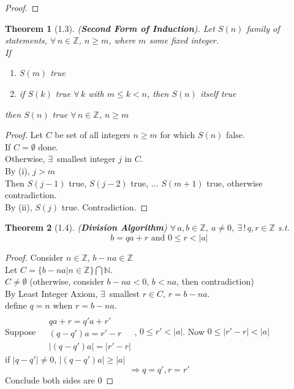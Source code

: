 \documentclass[twoside,landscape]{amsart}
\theoremstyle{plain}
\newtheorem{theorem}{Theorem}
\theoremstyle{definition}
\theoremstyle{remark}
\begin{document}
\begin{multicols*}{2}
\begin{proof}
\end{proof}


\begin{theorem}[1.3] (\textbf{Second Form of Induction}).  Let $S(n)$ family of statements, $\forall \, n \in \mathbb{Z}$, $n\geq m$, where $m$ some fixed integer.  \\
If \begin{enumerate}
\item[(i)] $S(m)$ true 
\item[(ii)] if $S(k)$ true $\forall \, k $ with $m \leq k <n$, then $S(n)$ itself true
\end{enumerate}
then $S(n)$ true $\forall \, n \in \mathbb{Z}$, $n\geq m$
\end{theorem}
\begin{proof} Let $C$ be set of all integers $n\geq m$ for which $S(n)$ false. \\
If $C =\emptyset$ done. \\
Otherwise, $\exists \, $ smallest integer $j$ in $C$. \\

By (i), $j > m$ \\
Then $S(j-1)$ true, $S(j-2)$ true, $\dots$ $S(m+1)$ true, otherwise contradiction. \\
By (ii), $S(j)$ true.  Contradiction.

\end{proof}

\begin{theorem}[1.4] (\textbf{Division Algorithm})
  $\forall \, a , b \in \mathbb{Z}$, $a\neq 0$, $\exists \, ! \, q,r \in \mathbb{Z}$ s.t. 
\[
b = qa + r \text{ and } 0 \leq r < |a|
\]
\end{theorem}
\begin{proof}
Consider $n \in \mathbb{Z}$, $b-na \in \mathbb{Z}$ \\
Let $C= \lbrace b - na | n \in \mathbb{Z} \rbrace \bigcap \mathbb{N}$.  \\
\phantom{\quad} $C\neq \emptyset$ (otherwise, consider $b-na < 0$, $b<na$, then contradiction) \\
By Least Integer Axiom, $\exists \, $ smallest $r\in C$, $r= b-na$.  \\
\phantom{\quad } define $q=n$ when $r=b-na$.  \\
Suppose $\begin{aligned} & \quad \\ & qa + r = q'a + r' \\ & (q-q')a = r'-r \\ & |(q-q')a| = |r'-r| \end{aligned}$, $0\leq r' < |a|$.  Now $0\leq |r'-r | < |a|$ \\
\phantom{\quad } if $|q-q'| \neq 0$, $|(q-q')a | \geq |a|$ 
\[
\Longrightarrow q=q', r=r'
\]
Conclude both sides are $0$
\end{proof}


\end{multicols*}
\end{document}
